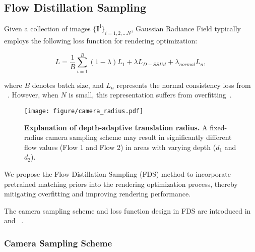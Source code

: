 \subsection{Flow Distillation Sampling}
\label{sec:method:fds}
Given a collection of images $\{\bm{I^i}\}_{i=1,2,\dots N}$, 
Gaussian Radiance Field typically employs the following loss function for rendering optimization:

\begin{equation}
L = \frac{1}{B}\sum_{i=1}^B(1 - \lambda )L_1 + \lambda L_{D-SSIM} +
\lambda_{normal} L_{n} ,
\end{equation}

where $B$ denotes batch size, 
and $L_n$ represents the normal consistency loss from ~\citep{huang20242d}.
However, when $N$ is small, 
this representation suffers from
overfitting~\citep{li2024dngaussian, 
paliwal2024coherentgs}. 
%

\begin{wrapfigure}{htbp}{0.5\textwidth} \centering
    \vspace{-2.0em}
    \hspace{2.0em}
    \texttt{[image: figure/camera\_radius.pdf]}
    \caption{\textbf{Explanation of depth-adaptive translation radius.} A fixed-radius camera sampling scheme may result in significantly different flow values (Flow 1 and Flow 2) in areas with varying depth ($d_1$ and $d_2$).} \label{fig:camera}
    \vspace{-4.0em}
\end{wrapfigure}

We propose the Flow Distillation Sampling (FDS) method to 
incorporate pretrained matching priors into the rendering 
optimization process, thereby mitigating overfitting and 
improving rendering performance.



%
The camera sampling scheme and loss function design in FDS
are introduced in ~ 
and ~.


\subsubsection{Camera Sampling Scheme}
\label{sec:method:subsubsec:cs}


